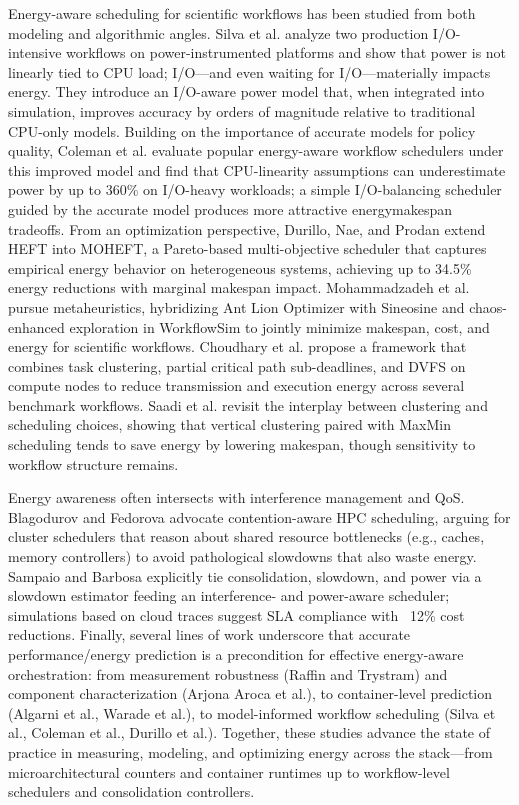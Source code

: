 Energy-aware scheduling for scientific workflows has been studied from both modeling and algorithmic angles. Silva et al. analyze two production I/O-intensive workflows on power-instrumented platforms and show that power is not linearly tied to CPU load; I/O—and even waiting for I/O—materially impacts energy. They introduce an I/O-aware power model that, when integrated into simulation, improves accuracy by orders of magnitude relative to traditional CPU-only models. Building on the importance of accurate models for policy quality, Coleman et al. evaluate popular energy-aware workflow schedulers under this improved model and find that CPU-linearity assumptions can underestimate power by up to 360\% on I/O-heavy workloads; a simple I/O-balancing scheduler guided by the accurate model produces more attractive energymakespan tradeoffs. From an optimization perspective, Durillo, Nae, and Prodan extend HEFT into MOHEFT, a Pareto-based multi-objective scheduler that captures empirical energy behavior on heterogeneous systems, achieving up to 34.5\% energy reductions with marginal makespan impact. Mohammadzadeh et al. pursue metaheuristics, hybridizing Ant Lion Optimizer with Sineosine and chaos-enhanced exploration in WorkflowSim to jointly minimize makespan, cost, and energy for scientific workflows. Choudhary et al. propose a framework that combines task clustering, partial critical path sub-deadlines, and DVFS on compute nodes to reduce transmission and execution energy across several benchmark workflows. Saadi et al. revisit the interplay between clustering and scheduling choices, showing that vertical clustering paired with MaxMin scheduling tends to save energy by lowering makespan, though sensitivity to workflow structure remains.

Energy awareness often intersects with interference management and QoS. Blagodurov and Fedorova advocate contention-aware HPC scheduling, arguing for cluster schedulers that reason about shared resource bottlenecks (e.g., caches, memory controllers) to avoid pathological slowdowns that also waste energy. Sampaio and Barbosa explicitly tie consolidation, slowdown, and power via a slowdown estimator feeding an interference- and power-aware scheduler; simulations based on cloud traces suggest SLA compliance with ~12\% cost reductions. Finally, several lines of work underscore that accurate performance/energy prediction is a precondition for effective energy-aware orchestration: from measurement robustness (Raffin and Trystram) and component characterization (Arjona Aroca et al.), to container-level prediction (Algarni et al., Warade et al.), to model-informed workflow scheduling (Silva et al., Coleman et al., Durillo et al.). Together, these studies advance the state of practice in measuring, modeling, and optimizing energy across the stack—from microarchitectural counters and container runtimes up to workflow-level schedulers and consolidation controllers.